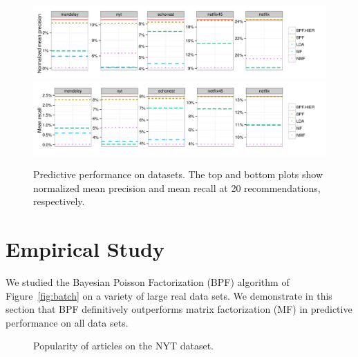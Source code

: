 
\begin{figure}[t!]
\centering
\includegraphics[width=\textwidth]{figures/mean_precision_at_20.pdf}\\
\includegraphics[width=\textwidth]{figures/mean_recall_at_20.pdf}\\
\caption{Predictive performance on datasets. The top and bottom plots
  show normalized mean precision and mean recall at 20
  recommendations, respectively.}
\label{fig:precision_recall_at_10}
\end{figure}


\section{Empirical Study}
We studied the Bayesian Poisson Factorization (BPF) algorithm of
Figure~\ref{fig:batch} on a variety of large real data sets. We
demonstrate in this section that BPF definitively outperforms matrix
factorization (MF) in predictive performance on all data sets.
\begin{figure}[th]
\centering
{}
\caption{Popularity of articles on the NYT dataset.}
\label{fig:nyt-expl}
\end{figure}


